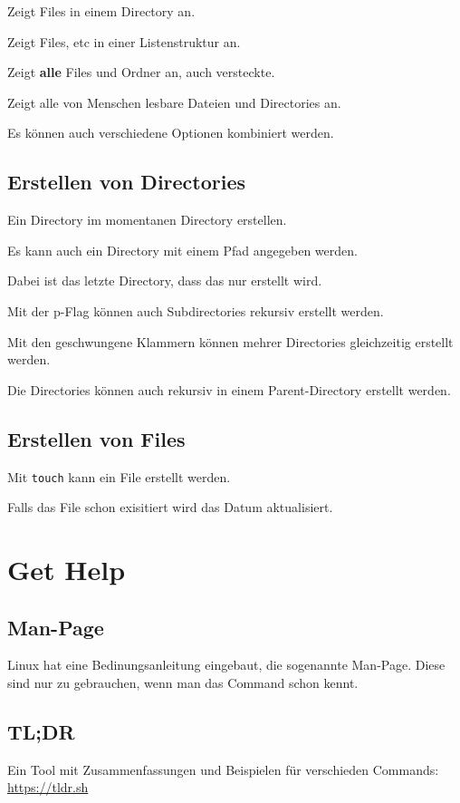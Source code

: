 \documentclass{article}
\begin{document}
Zeigt Files in einem Directory an.

Zeigt Files, etc in einer Listenstruktur an.

Zeigt \textbf{alle} Files und Ordner an, auch versteckte.

Zeigt alle von Menschen lesbare Dateien und Directories an.

Es können auch verschiedene Optionen kombiniert werden.

\subsection{Erstellen von Directories}

Ein Directory im momentanen Directory erstellen.

Es kann auch ein Directory mit einem Pfad angegeben werden.

Dabei ist das letzte Directory, dass das nur erstellt wird.

Mit der p-Flag können auch Subdirectories rekursiv erstellt werden.

Mit den geschwungene Klammern können mehrer Directories gleichzeitig erstellt werden.

Die Directories können auch rekursiv in einem Parent-Directory erstellt werden.

\subsection{Erstellen von Files}

Mit \texttt{touch} kann ein File erstellt werden.

Falls das File schon exisitiert wird das Datum aktualisiert.


\section{Get Help}
\subsection{Man-Page}
Linux hat eine Bedinungsanleitung eingebaut, die sogenannte Man-Page.
Diese sind nur zu gebrauchen, wenn man das Command schon kennt.

\subsection{TL;DR}
Ein Tool mit Zusammenfassungen und Beispielen für verschieden Commands: \href{https://tldr.sh/}{https://tldr.sh}
\end{document}
